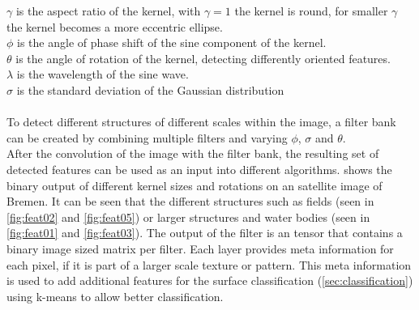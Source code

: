 \documentclass[12pt,a4paper, english,twoside]{article}
\begin{document}
    $\gamma$ is the aspect ratio of the kernel, with $\gamma = 1$ the kernel is round, for smaller $\gamma$ the kernel becomes a more eccentric ellipse.\\
    $\phi$ is the angle of phase shift of the sine component of the kernel. \\
    $\theta$ is the angle of rotation of the kernel, detecting differently oriented features.\\
    $\lambda$ is the wavelength of the sine wave. \\
    $\sigma$ is the standard deviation of the Gaussian distribution\\ \\
    \noindent
    To detect different structures of different scales within the image, a filter bank can be created by combining multiple filters and varying $\phi$, $\sigma$ and $\theta$.\\
    After the convolution of the image with the filter bank, the resulting set of detected features can be used as an input into different algorithms.
     shows the binary output of different kernel sizes and rotations on an satellite image of Bremen. 
    It can be seen that the different structures such as fields (seen in \cref{fig:feat02} and \cref{fig:feat05}) or larger structures and water bodies (seen in \cref{fig:feat01} and \cref{fig:feat03}).
    The output of the filter is an tensor that contains a binary image sized matrix per filter. Each layer provides meta information for each pixel, if it is part of a larger scale texture or pattern. 
    This meta information is used to add additional features for the surface classification (\cref{sec:classification}) using k-means %
    to allow better classification.%
\end{document}
